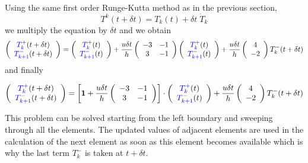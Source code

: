 Using the same first order Runge-Kutta method as in the previous section, 
\begin{equation}
T^k(t+\delta t)=T_k(t) +\delta t \; \dot{T}_k
\end{equation}
we multiply the equation by $\delta t$ and we obtain 
\begin{eqnarray}
\left(
\begin{array}{cc}
{\color{blue} T_k^+}(t+\delta t)  \\
{\color{blue}T_{k+1}^-} (t+\delta t) 
\end{array}
\right)=
 \left(
\begin{array}{cc}
{\color{blue} T_k^+} (t) \\
{\color{blue}T_{k+1}^-} (t) 
\end{array}
\right)+
\frac{u \delta t}{h} 
\left(\begin{array}{cc}
    -3 & -1 \\
     3 & -1
\end{array}
\right)
\left(
\begin{array}{cc}
{\color{blue}T_k^+} (t) \\
{\color{blue}T_{k+1}^-} (t)
\end{array}
\right) + 
\frac{u \delta t}{h} \left(
\begin{array}{cc}
     4   \\
     -2 
\end{array}
\right)T_k^- (t+\delta t) 
\end{eqnarray}
and finally
\begin{mdframed}[backgroundcolor=blue!5]
\begin{eqnarray}
\left(
\begin{array}{cc}
{\color{blue} T_k^+}(t+\delta t)  \\
{\color{blue}T_{k+1}^-} (t+\delta t) 
\end{array}
\right)=
\left[
{\bm 1} + 
\frac{u \delta t}{h} 
\left(\begin{array}{cc}
    -3 & -1 \\
     3 & -1
\end{array}
\right)
\right]\cdot
\left(
\begin{array}{cc}
{\color{blue}T_k^+} (t) \\
{\color{blue}T_{k+1}^-} (t)
\end{array}
\right) + 
\frac{u \delta t}{h} \left(
\begin{array}{cc}
     4   \\
     -2 
\end{array}
\right)T_k^- (t+\delta t) 
\end{eqnarray}
\end{mdframed}







This problem can be solved starting from the left boundary and sweeping through all the elements. The updated values of adjacent elements are used in the calculation of the next element as soon as this element becomes available which is why 
the last term $T_k^-$ is taken  at $t+\delta t$.
